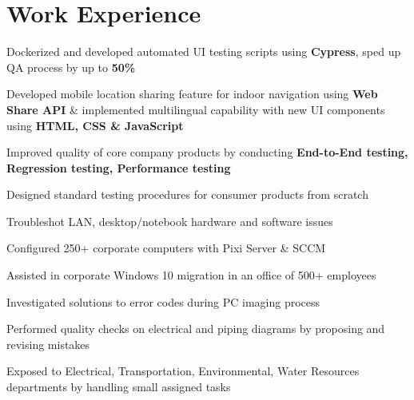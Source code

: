 \documentclass[]{morris-cv}
\begin{document}
\hfill
\begin{minipage}[t]{0.67\textwidth} 


\section{Work Experience}
\vspace{\topsep} %
\begin{tightemize}
    \item Dockerized and developed automated UI testing scripts using \textbf{Cypress},
    sped up QA process by up to \textbf{50\%}
    \item Developed mobile location sharing feature for indoor navigation using \textbf{Web Share API} \& implemented multilingual capability with new UI components using \textbf{HTML, CSS \& JavaScript}  
    \item Improved quality of core company products by conducting \textbf{End-to-End testing, Regression testing, Performance testing}
    \item Designed standard testing procedures for consumer products from scratch
\end{tightemize}
\sectionsep

\begin{tightemize}
    \item Troubleshot LAN, desktop/notebook hardware and software issues
    \item Configured 250+ corporate computers with Pixi Server \& SCCM
    \item Assisted in corporate Windows 10 migration in an office of 500+ employees
    \item Investigated solutions to error codes during PC imaging process
\end{tightemize}
\sectionsep

\begin{tightemize}
    \item Performed quality checks on electrical and piping diagrams by proposing and revising mistakes
    \item Exposed to Electrical, Transportation, Environmental, Water Resources departments by handling small assigned tasks
\end{tightemize}
\sectionsep


\end{minipage}
\end{document}
